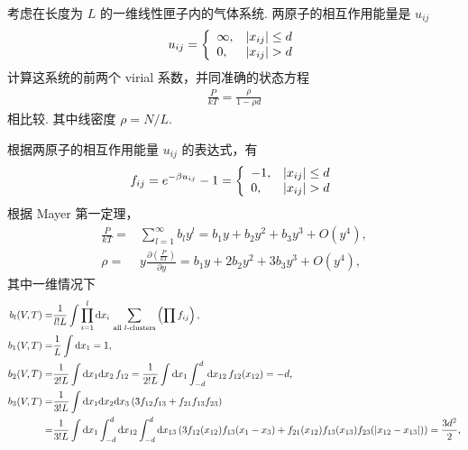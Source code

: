 \documentclass{assignment}
\begin{document}
\begin{prob}
    考虑在长度为 $L$ 的一维线性匣子内的气体系统. 两原子的相互作用能量是 $u_{ij}$
    \begin{align}
        u_{ij}=\left\{\begin{array}{ll}
            \infty,&\left\lvert x_{ij}\right\rvert\leq d\\
            0,&\left\lvert x_{ij}\right\rvert>d
        \end{array}\right.
    \end{align}
    计算这系统的前两个 virial 系数，并同准确的状态方程
    \begin{align}
        \frac{P}{kT}=\frac{\rho}{1-\rho d}
    \end{align}
    相比较. 其中线密度 $\rho=N/L$.
\end{prob}
\begin{sol}
    根据两原子的相互作用能量 $u_{ij}$ 的表达式，有
    \begin{align}
        f_{ij}=e^{-\beta u_{ij}}-1=\left\{\begin{array}{ll}
            -1,&\left\lvert x_{ij}\right\rvert\leq d\\
            0,&\left\lvert x_{ij}\right\rvert>d
        \end{array}\right.
    \end{align}
    根据 Mayer 第一定理，
    \begin{align}
        \label{2-P/kT}
        \frac{P}{kT}=&\sum_{l=1}^{\infty}b_ly^l=b_1y+b_2y^2+b_3y^3+O(y^4),\\
        \label{2-rho}
        \rho=&y\frac{\partial\left(\frac{P}{kT}\right)}{\partial y}=b_1y+2b_2y^2+3b_3y^3+O(y^4),
    \end{align}
    其中一维情况下
    \begin{align}
        b_l(V,T)=&\frac{1}{l!L}\int\prod_{i=1}^l\mathrm{d}x_i\,\sum_{\text{all $l$-clusters}}\left(\prod f_{ij}\right),\\
        b_1(V,T)=&\frac{1}{L}\int\mathrm{d}x_1=1,\\
        b_2(V,T)=&\frac{1}{2!L}\int\mathrm{d}x_1\mathrm{d}x_2\,f_{12}=\frac{1}{2!L}\int\mathrm{d}x_1\int_{-d}^d\mathrm{d}x_{12}\,f_{12}(x_{12})=-d,\\
        \notag b_3(V,T)=&\frac{1}{3!L}\int\mathrm{d}x_1\mathrm{d}x_2\mathrm{d}x_3\,(3f_{12}f_{13}+f_{21}f_{13}f_{23})\\
        \notag=&\frac{1}{3!L}\int\mathrm{d}x_1\int_{-d}^d\mathrm{d}x_{12}\int_{-d}^d\mathrm{d}x_{13}\,(3f_{12}(x_{12})f_{13}(x_1-x_3)+f_{21}(x_{12})f_{13}(x_{13})f_{23}(\left\lvert x_{12}-x_{13}\right\rvert))=\frac{3d^2}{2},
    \end{align}

\end{sol}
\end{document}
